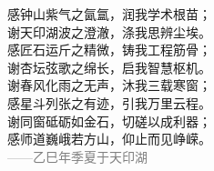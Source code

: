 \documentclass[a4paper]{njit}
\begin{document}
\thanking
{
  \begin{center}
    \begin{minipage}{0.8\textwidth}
        \centering
        
        感钟山紫气之氤氲，润我学术根苗；\\
        谢天印湖波之澄澈，涤我思辨尘埃。\\
        感匠石运斤之精微，铸我工程筋骨；\\
        谢杏坛弦歌之绵长，启我智慧枢机。\\[0.5em]
        
        谢春风化雨之无声，沐我三载寒窗；\\
        感星斗列张之有迹，引我万里云程。\\
        谢同窗砥砺如金石，切磋以成利器；\\
        感师道巍峨若方山，仰止而见峥嵘。\\[1em]
        
       \hfill \textcolor{gray}{——乙巳年季夏于天印湖}
    \end{minipage}
\end{center}
}

\end{document}
